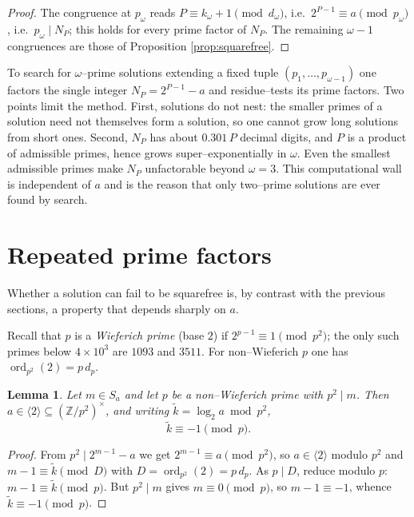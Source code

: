 \documentclass[11pt,reqno]{amsart}
\theoremstyle{plain}
\newtheorem{lemma}{Lemma}
\theoremstyle{definition}
\theoremstyle{remark}
\newcommand{\Z}{\mathbb{Z}}
\newcommand{\ord}{\operatorname{ord}}
\newcommand{\dvd}{\mid}
\newcommand{\Sa}{S_a}
\begin{document}
\begin{proof}
The congruence at $p_\omega$ reads $P\equiv k_\omega+1\pmod{d_\omega}$, i.e.\ $2^{P-1}\equiv a\pmod{p_\omega}$, i.e.\ $p_\omega\dvd N_P$; this holds for every prime factor of $N_P$. The remaining $\omega-1$ congruences are those of Proposition \ref{prop:squarefree}.
\end{proof}

To search for $\omega$--prime solutions extending a fixed tuple $(p_1,\dots,p_{\omega-1})$ one factors the single integer $N_P=2^{P-1}-a$ and residue--tests its prime factors. Two points limit the method. First, solutions do not nest: the smaller primes of a solution need not themselves form a solution, so one cannot grow long solutions from short ones. Second, $N_P$ has about $0.301\,P$ decimal digits, and $P$ is a product of admissible primes, hence grows super--exponentially in $\omega$. Even the smallest admissible primes make $N_P$ unfactorable beyond $\omega=3$. This computational wall is independent of $a$ and is the reason that only two--prime solutions are ever found by search.

\section{Repeated prime factors}\label{sec:repeated}

Whether a solution can fail to be squarefree is, by contrast with the previous sections, a property that depends sharply on $a$.

Recall that $p$ is a \emph{Wieferich prime} (base $2$) if $2^{p-1}\equiv1\pmod{p^{2}}$; the only such primes below $4\times10^{3}$ are $1093$ and $3511$. For non--Wieferich $p$ one has $\ord_{p^{2}}(2)=p\,d_p$.

\begin{lemma}\label{lem:wieferich}
Let $m\in\Sa$ and let $p$ be a non--Wieferich prime with $p^{2}\dvd m$. Then $a\in\langle2\rangle\subseteq(\Z/p^{2})^{\times}$, and writing $\widetilde k=\log_2a\bmod p^{2}$,
\[
\widetilde k\equiv-1\pmod p.
\]
\end{lemma}

\begin{proof}
From $p^{2}\dvd2^{m-1}-a$ we get $2^{m-1}\equiv a\pmod{p^{2}}$, so $a\in\langle2\rangle$ modulo $p^{2}$ and $m-1\equiv\widetilde k\pmod{D}$ with $D=\ord_{p^{2}}(2)=p\,d_p$. As $p\dvd D$, reduce modulo $p$: $m-1\equiv\widetilde k\pmod p$. But $p^{2}\dvd m$ gives $m\equiv0\pmod p$, so $m-1\equiv-1$, whence $\widetilde k\equiv-1\pmod p$.
\end{proof}
\end{document}
